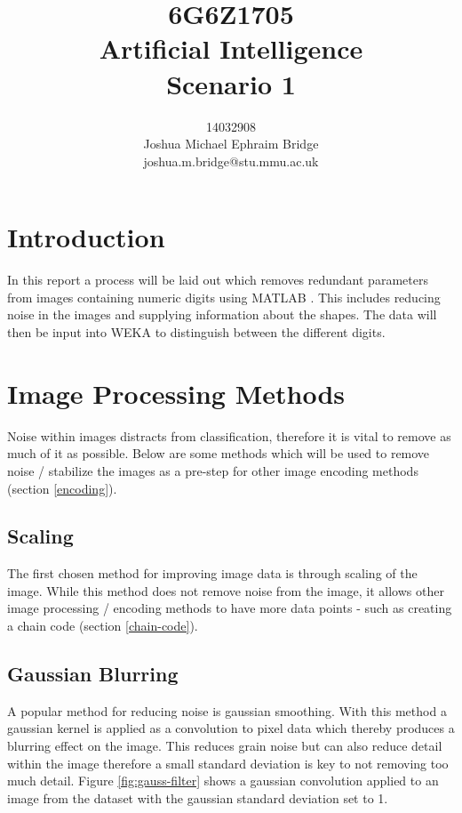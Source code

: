 \documentclass[12pt]{article}
\title{\vspace{2cm}6G6Z1705\\\textbf{Artificial Intelligence}\\\vspace{2cm}Scenario 1\\\vspace{2cm}}
\author{14032908\\Joshua Michael Ephraim Bridge\\joshua.m.bridge@stu.mmu.ac.uk\\\vspace{1cm}}
\begin{document}
\maketitle

\newpage

\onehalfspacing

\section{Introduction}
In this report a process will be laid out which removes redundant parameters from images containing numeric digits using MATLAB \citep{matlab}. This includes reducing noise in the images and supplying information about the shapes. The data will then be input into WEKA \citep{hall2009weka} to distinguish between the different digits.

\section{Image Processing Methods}
  Noise within images distracts from classification, therefore it is vital to remove as much of it as possible. Below are some methods which will be used to remove noise / stabilize the images as a pre-step for other image encoding methods (section \ref{encoding}).

  \subsection{Scaling}
    The first chosen method for improving image data is through scaling of the image. While this method does not remove noise from the image, it allows other image processing / encoding methods to have more data points - such as creating a chain code (section \ref{chain-code}).

  \subsection{Gaussian Blurring} \label{sec:gauss-blur}
    A popular method for reducing noise is gaussian smoothing. With this method a gaussian kernel is applied as a convolution to pixel data which thereby produces a blurring effect on the image. This reduces grain noise but can also reduce detail within the image therefore a small standard deviation is key to not removing too much detail. Figure \ref{fig:gauss-filter} shows a gaussian convolution applied to an image from the dataset with the gaussian standard deviation set to 1.
\end{document}
